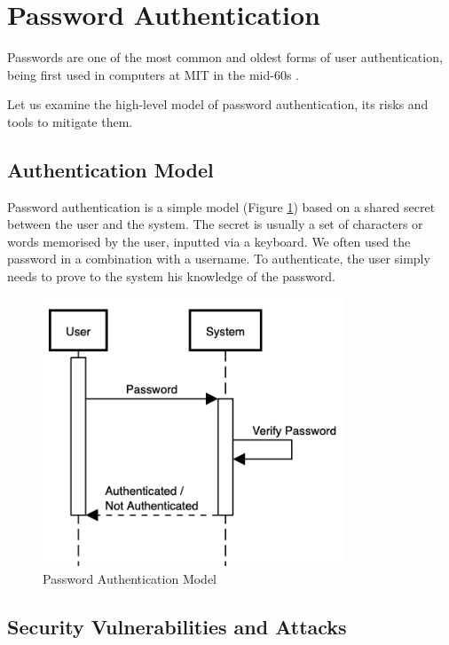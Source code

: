 \section{Password Authentication}
\label{section:password-authentication}

Passwords are one of the most common and oldest forms of user authentication, being first used in computers at MIT in the mid-60s \cite{mcmillan2012password}.

Let us examine the high-level model of password authentication, its risks and tools to mitigate them.

\subsection{Authentication Model}

Password authentication is a simple model (Figure  \ref{fig:password-authentication}) based on a shared secret between the user and the system. The secret is usually a set of characters or words memorised by the user, inputted via a keyboard.
We often used the password in a combination with a username.
To authenticate, the user simply needs to prove to the system his knowledge of the password.


\begin{figure}[h]
	\centering
	\includegraphics[height=8cm]{images/password-authentication}
	\caption{Password Authentication Model}
	\label{fig:password-authentication}
\end{figure}

\subsection{Security Vulnerabilities and Attacks}
\label{label:password-vulnerabilities}

